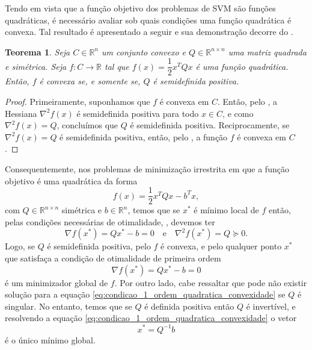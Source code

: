 \documentclass[12pt,a4paper]{scrartcl}
\def\RR{\mathds{R}}
\newtheorem{teo}{Teorema}
\theoremstyle{definition}%
\begin{document}
Tendo em vista que a função objetivo dos problemas de SVM são funções quadráticas, é necessário avaliar sob quais condições uma função quadrática é convexa. Tal resultado é apresentado a seguir e sua demonstração decorre do .

\begin{teo} \label{teo:funcao_quadratica_e_convexa}
Seja $C \in \RR^{n}$ um conjunto convexo e $Q \in \RR^{n\times n}$ uma matriz quadrada e simétrica. Seja $f:C \rightarrow \RR$ tal que $f(x) = \dfrac{1}{2}x^{T}Qx$ é uma função quadrática. Então, $f$ é convexa se, e somente se, $Q$ é semidefinida positiva.
\end{teo}
\begin{proof}
Primeiramente, suponhamos que $f$ é convexa em $C$. Então, pelo , a Hessiana $\nabla^{2} f(x)$ é semidefinida positiva para todo $x\in C$, e como $\nabla^{2} f(x) = Q$, concluímos que $Q$ é semidefinida positiva. Reciprocamente, se $\nabla^{2} f(x) = Q$ é semidefinida positiva, então, pelo , a função $f$ é convexa em $C$.
\end{proof}

Consequentemente, nos problemas de minimização irrestrita em que a função objetivo é uma quadrática da forma
\[
f(x) = \dfrac{1}{2}x^{T}Qx - b^{T}x,
\]
com $Q\in \RR^{n\times n}$ simétrica e $b\in \RR^{n}$, 
temos que se $x^{*}$ é mínimo local de $f$ então, pelas condições necessárias de otimalidade, , devemos ter
\[
\nabla f(x^{*})= Qx^{*}-b =0 \quad \text{e} \quad \nabla^{2} f(x^{*})=Q \succcurlyeq 0.
\]
Logo, se $Q$ é semidefinida positiva, pelo  $f$ é convexa, e pelo  qualquer ponto $x^{*}$ que satisfaça a condição de otimalidade de primeira ordem 
\[ \label{eq:condicao_1_ordem_quadratica_convexidade}
\nabla f(x^{*})= Qx^{*}-b =0
\] 
é um minimizador global de $f$. Por outro lado, cabe ressaltar que pode não existir solução para a equação \eqref{eq:condicao_1_ordem_quadratica_convexidade} se $Q$ é singular. No entanto, temos que se $Q$ é definida positiva então $Q$ é invertível, e resolvendo a equação \eqref{eq:condicao_1_ordem_quadratica_convexidade} o vetor
\[
x^{*} = Q^{-1}b
\]  
é o único mínimo global.

\end{document}
